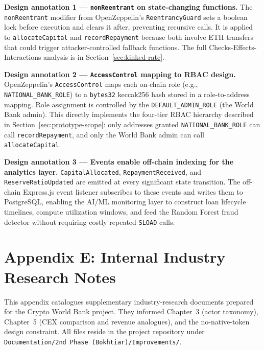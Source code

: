 \documentclass[12pt, a4paper]{report}
\begin{document}
\textbf{Design annotation 1 --- \texttt{nonReentrant} on state-changing functions.}
The \texttt{nonReentrant} modifier from OpenZeppelin's \texttt{ReentrancyGuard} sets a boolean lock before execution and clears it after, preventing recursive calls. It is applied to \texttt{allocateCapital} and \texttt{recordRepayment} because both involve ETH transfers that could trigger attacker-controlled fallback functions. The full Checks-Effects-Interactions analysis is in Section~\ref{sec:kinked-rate}.

\textbf{Design annotation 2 --- \texttt{AccessControl} mapping to RBAC design.}
OpenZeppelin's \texttt{AccessControl} maps each on-chain role (e.g., \texttt{NATIONAL\_BANK\_ROLE}) to a \texttt{bytes32} keccak256 hash stored in a role-to-address mapping. Role assignment is controlled by the \texttt{DEFAULT\_ADMIN\_ROLE} (the World Bank admin). This directly implements the four-tier RBAC hierarchy described in Section~\ref{sec:prototype-scope}: only addresses granted \texttt{NATIONAL\_BANK\_ROLE} can call \texttt{recordRepayment}, and only the World Bank admin can call \texttt{allocateCapital}.

\textbf{Design annotation 3 --- Events enable off-chain indexing for the analytics layer.}
\texttt{CapitalAllocated}, \texttt{RepaymentReceived}, and \texttt{ReserveRatioUpdated} are emitted at every significant state transition. The off-chain Express.js event listener subscribes to these events and writes them to PostgreSQL, enabling the AI/ML monitoring layer to construct loan lifecycle timelines, compute utilization windows, and feed the Random Forest fraud detector without requiring costly repeated \texttt{SLOAD} calls.

\chapter*{Appendix E: Internal Industry Research Notes}
{}
\label{app:internal-research}

This appendix catalogues supplementary industry-research documents prepared for the Crypto World Bank project. They informed Chapter~3 (actor taxonomy), Chapter~5 (CEX comparison and revenue analogues), and the no-native-token design constraint. All files reside in the project repository under \texttt{Documentation/2nd Phase (Bokhtiar)/Improvements/}.
\end{document}
